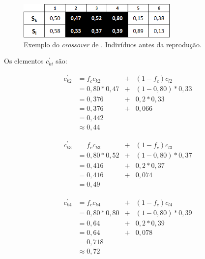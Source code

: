 	\begin{figure}[htbp]
	\centering
		\includegraphics[width=0.70\textwidth]{figs/materiais_metodo/autovalores_com_ga/cross2011_tabelaAntes.png}
	\caption{Exemplo do \emph{crossover} de \cite{metodo2011}. Indivíduos antes da reprodução.}
	\label{fig:cross2011_tabelaAntes}
\end{figure}
	
	Os elementos $c^{'}_{ki}$ são:
	
	\begin{equation}
		\begin{array}{llcl}
			c^{'}_{k2}	& = f_c c_{k2} 		& + & (1- f_c) c_{l2} \\
									& = 0,80 * 0,47		& + &	(1 - 0,80) * 0,33 \\
									& = 0,376					& + & 0,2 * 0,33	\\
									& = 0,376					& + & 0,066	\\
									& = 0,442 \\
									& \approx 0,44
		\end{array}
	\end{equation}
	
	
	\begin{equation}
		\begin{array}{llcl}
			c^{'}_{k3}	& = f_c c_{k3} 		& + & (1- f_c) c_{l3} \\
									& = 0,80 * 0,52		& + &	(1 - 0,80) * 0,37 \\
									& = 0,416					& + & 0,2 * 0,37	\\
									& = 0,416					& + & 0,074	\\
									& = 0,49
		\end{array}
	\end{equation}
	
	
	\begin{equation}
		\begin{array}{llcl}
			c^{'}_{k4}	& = f_c c_{k4} 		& + & (1- f_c) c_{l4} \\
									& = 0,80 * 0,80		& + &	(1 - 0,80) * 0,39 \\
									& = 0,64					& + & 0,2 * 0,39	\\
									& = 0,64					& + & 0,078	\\
									& = 0,718 \\
									& \approx 0,72
		\end{array}
	\end{equation}
	
